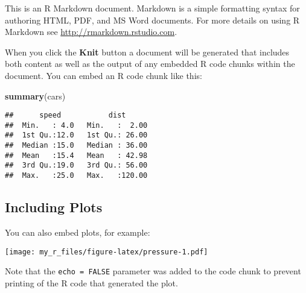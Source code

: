 \documentclass[
]{article}
\newenvironment{Shaded}{\begin{snugshade}}{\end{snugshade}}
\newcommand{\FunctionTok}[1]{\textcolor[rgb]{0.13,0.29,0.53}{\textbf{#1}}}
\newcommand{\NormalTok}[1]{#1}
\begin{document}
This is an R Markdown document. Markdown is a simple formatting syntax
for authoring HTML, PDF, and MS Word documents. For more details on
using R Markdown see \url{http://rmarkdown.rstudio.com}.

When you click the \textbf{Knit} button a document will be generated
that includes both content as well as the output of any embedded R code
chunks within the document. You can embed an R code chunk like this:

\begin{Shaded}
\begin{Highlighting}[]
\FunctionTok{summary}\NormalTok{(cars)}
\end{Highlighting}
\end{Shaded}

\begin{verbatim}
##      speed           dist       
##  Min.   : 4.0   Min.   :  2.00  
##  1st Qu.:12.0   1st Qu.: 26.00  
##  Median :15.0   Median : 36.00  
##  Mean   :15.4   Mean   : 42.98  
##  3rd Qu.:19.0   3rd Qu.: 56.00  
##  Max.   :25.0   Max.   :120.00
\end{verbatim}

\hypertarget{including-plots}{%
\subsection{Including Plots}\label{including-plots}}

You can also embed plots, for example:

\texttt{[image: my\_r\_files/figure-latex/pressure-1.pdf]}

Note that the \texttt{echo\ =\ FALSE} parameter was added to the code
chunk to prevent printing of the R code that generated the plot.
\end{document}
